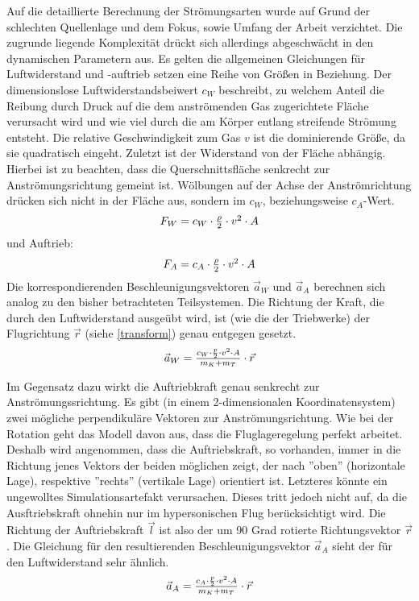 Auf die detaillierte Berechnung der Strö\-mungs\-arten wurde auf Grund der schlechten Quellenlage und dem Fokus, sowie Umfang der Arbeit verzichtet. Die zugrunde liegende Komplexität drückt sich allerdings abgeschwächt in den dynamischen Parametern aus. Es gelten die allgemeinen Gleichungen für Luftwiderstand und -auftrieb setzen eine Reihe von Größen in Beziehung. Der dimensionslose Luftwiderstandsbeiwert $c_W$ beschreibt, zu welchem Anteil die Reibung durch Druck auf die dem anströmenden Gas zugerichtete Fläche verursacht wird  und wie viel durch die am Körper entlang streifende Strömung entsteht. Die relative Geschwindigkeit zum Gas $v$ ist die dominierende Größe, da sie quadratisch eingeht. Zuletzt ist der Widerstand von der Fläche abhängig. Hierbei ist zu beachten, dass die Querschnittsfläche senkrecht zur Anströmungsrichtung gemeint ist. Wölbungen auf der Achse der Anströmrichtung drücken sich nicht in der Fläche aus, sondern im $c_W$, beziehungsweise $c_A$-Wert.
\begin{equation}
	$$ F_W = c_W \cdot \frac{\rho}{2} \cdot v^{2} \cdot A $$
\end{equation}
und Auftrieb:
\begin{equation}
	$$ F_A = c_A \cdot \frac{\rho}{2} \cdot v^{2} \cdot A $$
\end{equation}
Die korrespondierenden Beschleunigungsvektoren $\vec a_W$ und $\vec a_A$ berechnen sich analog zu den bisher betrachteten Teilsystemen. Die Richtung der Kraft, die durch den Luftwiderstand ausgeübt wird, ist (wie die der Triebwerke) der Flugrichtung $\vec r$ (siehe \ref{transform}) genau entgegen gesetzt.
\begin{equation}
	$$ \vec a_W = \frac{c_W \cdot \frac{p}{2} \cdot v^{2} \cdot A}{m_K + m_T} \cdot \vec r $$
\end{equation}

Im Gegensatz dazu wirkt die Auftriebkraft genau senkrecht zur Anströmungssrichtung. Es gibt (in einem 2-dimensionalen Koordinatensystem) zwei mögliche perpendikuläre Vektoren zur Anströmungsrichtung. Wie bei der Rotation geht das Modell davon aus, dass die Fluglageregelung perfekt arbeitet. Deshalb wird angenommen, dass die Auftriebskraft, so vorhanden, immer in die Richtung jenes Vektors der beiden möglichen zeigt, der nach ''oben'' (horizontale Lage), respektive ''rechts'' (vertikale Lage) orientiert ist. Letzteres könnte ein ungewolltes Simulationsartefakt verursachen. Dieses tritt jedoch nicht auf, da die Ausftriebskraft ohnehin nur im hypersonischen Flug berücksichtigt wird. Die Richtung der Auftriebskraft $\vec l$ ist also der um 90 Grad rotierte Richtungsvektor $\vec r$. Die Gleichung für den resultierenden Beschleunigungsvektor $\vec a_A$ sieht der für den Luftwiderstand sehr ähnlich.
\begin{equation}
	$$ \vec a_A = \frac{c_A \cdot \frac{p}{2} \cdot v^{2} \cdot A}{m_K + m_T} \cdot \vec r$$
\end{equation}